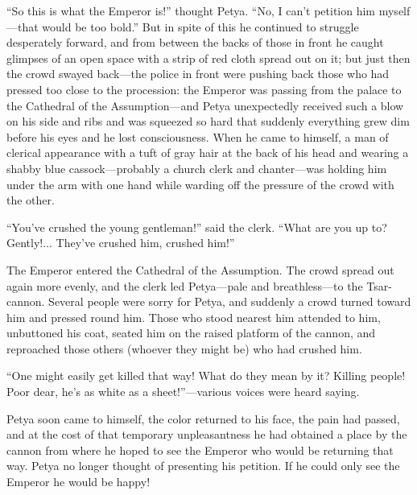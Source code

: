 ``So this is what the Emperor is!'' thought Petya. ``No, I can't
petition him myself---that would be too bold.'' But in spite of
this he continued to struggle desperately forward, and from
between the backs of those in front he caught glimpses of an open
space with a strip of red cloth spread out on it; but just then
the crowd swayed back---the police in front were pushing back
those who had pressed too close to the procession: the Emperor
was passing from the palace to the Cathedral of the
Assumption---and Petya unexpectedly received such a blow on his
side and ribs and was squeezed so hard that suddenly everything
grew dim before his eyes and he lost consciousness. When he came
to himself, a man of clerical appearance with a tuft of gray hair
at the back of his head and wearing a shabby blue
cassock---probably a church clerk and chanter---was holding him
under the arm with one hand while warding off the pressure of the
crowd with the other.

``You've crushed the young gentleman!'' said the clerk. ``What
are you up to? Gently!... They've crushed him, crushed him!''

The Emperor entered the Cathedral of the Assumption. The crowd
spread out again more evenly, and the clerk led Petya---pale and
breathless---to the Tsar-cannon. Several people were sorry for
Petya, and suddenly a crowd turned toward him and pressed round
him. Those who stood nearest him attended to him, unbuttoned his
coat, seated him on the raised platform of the cannon, and
reproached those others (whoever they might be) who had crushed
him.

``One might easily get killed that way! What do they mean by it?
Killing people! Poor dear, he's as white as a sheet!''---various
voices were heard saying.

Petya soon came to himself, the color returned to his face, the
pain had passed, and at the cost of that temporary unpleasantness
he had obtained a place by the cannon from where he hoped to see
the Emperor who would be returning that way. Petya no longer
thought of presenting his petition. If he could only see the
Emperor he would be happy!

